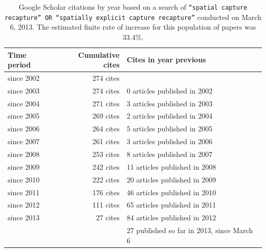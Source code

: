 \begin{table}[ht]
\caption{Google Scholar citations by year based on a search of
{\tt ``spatial capture recapture'' OR ``spatially explicit
capture recapture''} conducted on March 6, 2013. The estimated finite
rate of increase for this population of papers was 33.4\%.
}
\begin{tabular}{lrl} \hline \hline
Time period & Cumulative cites & Cites in year previous \\ \hline
since 2002 & 274 cites & \\
since 2003 & 274 cites &0 articles published in 2002 \\
since 2004 & 271 cites &3 articles published in 2003 \\
since 2005 & 269 cites &2 articles published in 2004 \\
since 2006 & 264 cites &5 articles published in 2005 \\
since 2007 & 261 cites &3 articles published in 2006 \\
since 2008 & 253 cites &8 articles published in 2007 \\
since 2009 & 242 cites &11 articles published in 2008 \\
since 2010 & 222 cites &20 articles published in 2009 \\
since 2011 & 176 cites &46 articles published in 2010 \\
since 2012 & 111 cites &65 articles published in 2011 \\
since 2013 & 27 cites &84 articles published in 2012 \\
& &27 published so far in 2013, since March 6
\\ \hline
\end{tabular}
\label{last.tab.cites}
\end{table}

